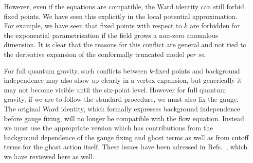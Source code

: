 \documentclass[11pt]{book}
\newcommand{\hk}{\hat k}
\numberwithin{equation}{chapter}
\begin{document}
However, even if the equations are compatible, the Ward identity can still forbid fixed points.
We have seen this explicitly in the local potential approximation.
For example, we have seen that fixed points with respect to $k$ are forbidden
for the exponential parametrisation if the field grows a non-zero anomalous dimension.
It is clear that the reasons for this conflict are general and not tied to the derivative expansion
of the conformally truncated model \textit{per se}.

For full quantum gravity, such conflicts between $k$-fixed points and
background independence may also show up clearly in a vertex expansion,
but generically it may not become visible until the six-point level.
However for full quantum gravity, if we are to follow the standard procedure, we must also fix the gauge.
The original Ward identity, which formally expresses background independence before gauge fixing,
will no longer be compatible with the flow equation.
Instead we must use the appropriate version which has contributions from the background dependence of
the gauge fixing and ghost terms as well as from cutoff terms for the ghost action itself.
These issues have been adressed in
Refs.~\cite{Morris:2016spn, Percacci:2016arh},
which we have reviewed here as well.


\end{document}
